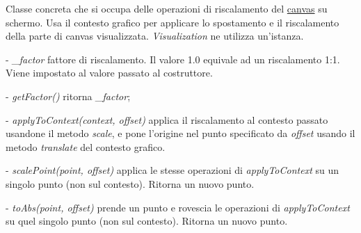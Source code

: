 Classe concreta che si occupa delle operazioni di riscalamento del \underline{canvas} su schermo. 
Usa il contesto grafico per applicare lo spostamento e il riscalamento della parte di canvas visualizzata.
\textit{Visualization} ne utilizza un'istanza.
\begin{elencopuntato}[\subsubsecindent]
\item[-] \textit{{\_}factor} fattore di riscalamento. Il valore 1.0 equivale ad un riscalamento 1:1. Viene impostato al valore passato al costruttore.
\end{elencopuntato}
\begin{elencopuntato}[\subsubsecindent]
\item[-] \textit{getFactor()} ritorna \textit{{\_}factor};
\item[-] \textit{applyToContext(context, offset)} applica il riscalamento al contesto passato usandone il metodo \textit{scale}, e pone l'origine nel punto specificato da \textit{offset} usando il metodo \textit{translate} del contesto grafico.
\item[-] \textit{scalePoint(point, offset)} applica le stesse operazioni di \textit{applyToContext} su un singolo punto (non sul contesto). Ritorna un nuovo punto.
\item[-] \textit{toAbs(point, offset)} prende un punto e rovescia le operazioni di \textit{applyToContext} su quel singolo punto (non sul contesto). Ritorna un nuovo punto.
\end{elencopuntato}

